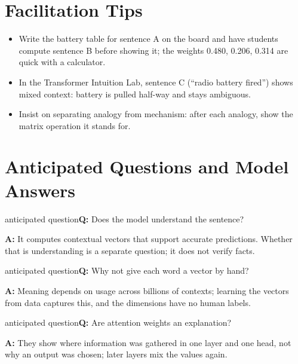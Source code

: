 \documentclass[11pt]{article}
\begin{document}
\section{Facilitation Tips}\begin{itemize}\item Write the battery table for sentence A on the board and have students compute sentence B before showing it; the weights 0.480, 0.206, 0.314 are quick with a calculator.\item In the Transformer Intuition Lab, sentence C (``radio battery fired'') shows mixed context: battery is pulled half-way and stays ambiguous.\item Insist on separating analogy from mechanism: after each analogy, show the matrix operation it stands for.\end{itemize}

\section{Anticipated Questions and Model Answers}

\begin{question}{anticipated question}\textbf{Q:} Does the model understand the sentence?\par\smallskip\textbf{A:} It computes contextual vectors that support accurate predictions. Whether that is understanding is a separate question; it does not verify facts.\end{question}

\begin{question}{anticipated question}\textbf{Q:} Why not give each word a vector by hand?\par\smallskip\textbf{A:} Meaning depends on usage across billions of contexts; learning the vectors from data captures this, and the dimensions have no human labels.\end{question}

\begin{question}{anticipated question}\textbf{Q:} Are attention weights an explanation?\par\smallskip\textbf{A:} They show where information was gathered in one layer and one head, not why an output was chosen; later layers mix the values again.\end{question}
\end{document}
